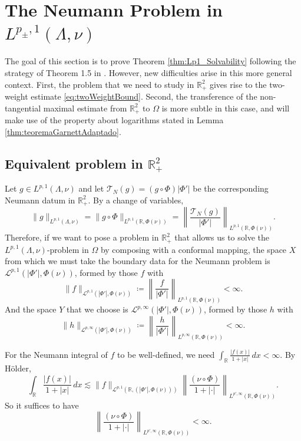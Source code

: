 \documentclass[12pt]{amsart}
\newcommand{\R}{\mathbb{R}}
\theoremstyle{plain}
\theoremstyle{definition}
\numberwithin{equation}{section}
\begin{document}
\section{The Neumann Problem in \texorpdfstring{$L^{p_{\pm},1}(\Lambda,\nu)$}{}}


The goal of this section is to prove Theorem \ref{thm:Lp1_Solvability} following the strategy of Theorem 1.5 in \cite{CNO}. However, new difficulties arise in this more general context. First, the problem that we need to study in $\R_{+}^{2}$ gives rise to the two-weight estimate \eqref{eq:twoWeightBound}. Second, the transference of the non-tangential maximal estimate from $\R_{+}^{2}$ to $\Omega$ is more subtle in this case, and will make use of the property about logarithms stated in Lemma \ref{thm:teoremaGarnettAdaptado}. 


\subsection{Equivalent problem in \texorpdfstring{$\R_{+}^{2}$}{}}

Let $g\in L^{p,1}(\Lambda, \nu)$ and let $\mathcal{T}_{N}(g)=(g\circ\Phi)|\Phi'|$ be the corresponding Neumann datum in $\R_{+}^{2}$. By a change of variables,
\[
\|g\|_{L^{p,1}(\Lambda, \nu)}
=
\|g\circ\Phi\|_{L^{p,1}(\R,\Phi(\nu))}
=
\left\|
\frac{\mathcal{T}_{N}(g)}{|\Phi'|}
\right\|_{L^{p,1}(\R,\Phi(\nu))}.
\]
Therefore, if we want to pose a problem in $\R_{+}^{2}$ that allows us to solve the $L^{p,1}(\Lambda,\nu)$-problem in $\Omega$ by composing with a conformal mapping, the space $X$ from which we must take the boundary data for the Neumann problem is $\mathcal{L}^{p,1}(|\Phi'|,\Phi(\nu))$, formed by those $f$ with
\[
\|f\|_{\mathcal{L}^{p,1}(|\Phi'|,\Phi(\nu))}
\coloneqq 
\left\|
\frac{f}{|\Phi'|}
\right\|_{L^{p,1}(\R,\Phi(\nu))}
<
\infty.
\]
And the space $Y$ that we choose is $\mathcal{L}^{p,\infty}(|\Phi'|,\Phi(\nu))$, formed by those $h$ with
\[
\|h\|_{\mathcal{L}^{p,\infty}(|\Phi'|,\Phi(\nu))}
\coloneqq 
\left\|
\frac{h}{|\Phi'|}
\right\|_{L^{p,\infty}(\R,\Phi(\nu))}
<
\infty.
\]


For the Neumann integral of $f$ to be well-defined, we need $\int_{\R}\frac{|f(x)|}{1+|x|}\, dx<\infty$. By Hölder,
\begin{equation}\label{eq:wellDefinedEndpointHolder}
\int_{\R}\frac{|f(x)|}{1+|x|}\, dx
\lesssim
\|f\|_{\mathcal{L}^{p,1}(\R,(|\Phi'|,\Phi(\nu)))}
\left\|\frac{(\nu\circ\Phi)}{1+|\cdot|}\right\|_{L^{p',\infty}(\R,\Phi(\nu))}.       
\end{equation}
So it suffices to have
\begin{equation}\label{eq:finiteNormWeights}
    \left\|\frac{(\nu\circ\Phi)}{1+|\cdot|}\right\|_{L^{p',\infty}(\R,\Phi(\nu))}
    <
    \infty.
\end{equation}
\end{document}
